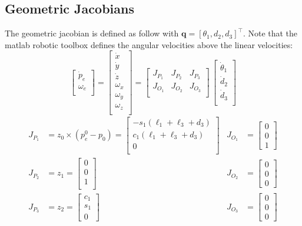 \documentclass[a4paper,12pt]{article}
\renewcommand*{\t}{\theta}
\renewcommand*{\l}{\ell}
\newcommand*{\q}{\bm{q}}
\begin{document}
\subsection{Geometric Jacobians}
The geometric jacobian is defined as follow with $\q = [\t_1,   d_2,   d_3]^\top$. Note that the matlab robotic toolbox defines the angular velocities above the linear velocities:
\[
\begin{bmatrix}
    \dot{p}_e \\
    \omega_e \\
\end{bmatrix}
 =
\begin{bmatrix}
    \dot{x} \\
    \dot{y} \\
    \dot{z} \\
    \omega_x \\
    \omega_y \\
    \omega_z \\
\end{bmatrix}
 =
\left[
\begin{array}{c|c|c}
    J_{P_1} & J_{P_2} & J_{P_3} \\
    J_{O_1} & J_{O_2} & J_{O_3} \\
\end{array}
\right]
\,
\begin{bmatrix}
    \dot{\t}_1 \\
    \dot{d}_2 \\
    \dot{d}_3 \\
\end{bmatrix}
\]
\begin{align*}
J_{P_1} &= z_0 \times (p^0_e  -  p_0) = \begin{bmatrix}
    -s_1(\l_1 + \l_3 + d_3) \\
    c_1(\l_1 + \l_3 + d_3)  \\
    0 \\
\end{bmatrix} 
&
J_{O_1} &= \begin{bmatrix}0\\0\\1\end{bmatrix}
\\
J_{P_2} &= z_1 = \begin{bmatrix}
     0 \\
     0 \\
     1 \\
\end{bmatrix} 
&
J_{O_2} &= \begin{bmatrix}0\\0\\0\end{bmatrix}
\\
J_{P_3} &= z_2 = \begin{bmatrix}
    c_1\\
    s_1\\
    0
\end{bmatrix}
&
J_{O_3} &= \begin{bmatrix}0\\0\\0\end{bmatrix}
\end{align*}
\end{document}

